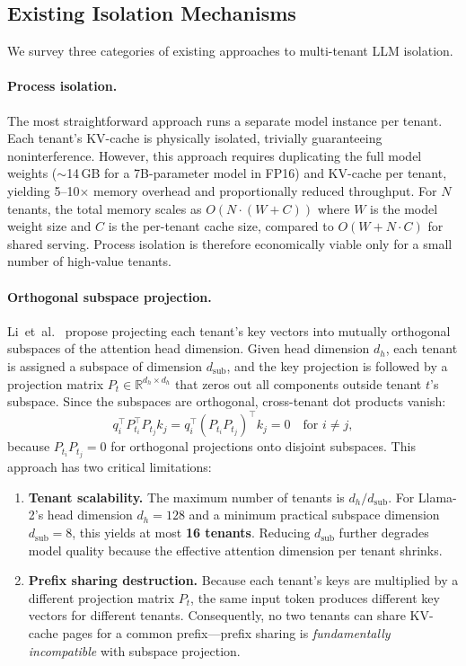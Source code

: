 \documentclass[11pt]{article}
\begin{document}
\subsection{Existing Isolation Mechanisms}
\label{sec:bg_isolation}

We survey three categories of existing approaches to multi-tenant LLM
isolation.

\paragraph{Process isolation.}
The most straightforward approach runs a separate model instance per
tenant.  Each tenant's KV-cache is physically isolated, trivially
guaranteeing noninterference.  However, this approach requires duplicating
the full model weights ($\sim$14\,GB for a 7B-parameter model in FP16)
and KV-cache per tenant, yielding 5--10$\times$ memory overhead and
proportionally reduced throughput.  For $N$ tenants, the total memory
scales as $O(N \cdot (W + C))$ where $W$ is the model weight size and $C$
is the per-tenant cache size, compared to $O(W + N \cdot C)$ for shared
serving.  Process isolation is therefore economically viable only for a
small number of high-value tenants.

\paragraph{Orthogonal subspace projection.}
Li~et~al.~\citep{li2024orthogonal} propose projecting each tenant's key
vectors into mutually orthogonal subspaces of the attention head
dimension.  Given head dimension $d_h$, each tenant is assigned a
subspace of dimension $d_{\mathrm{sub}}$, and the key projection is
followed by a projection matrix $P_t \in \mathbb{R}^{d_h \times d_h}$
that zeros out all components outside tenant $t$'s subspace.  Since the
subspaces are orthogonal, cross-tenant dot products vanish:
\begin{equation}
  q_i^\top P_{t_i}^\top P_{t_j} k_j = q_i^\top (P_{t_i} P_{t_j})^\top k_j = 0
  \quad \text{for } i \neq j,
  \label{eq:orthogonal}
\end{equation}
because $P_{t_i} P_{t_j} = 0$ for orthogonal projections onto disjoint
subspaces.  This approach has two critical limitations:
\begin{enumerate}[leftmargin=*,itemsep=2pt]
  \item \textbf{Tenant scalability.} The maximum number of tenants is
    $d_h / d_{\mathrm{sub}}$.  For Llama-2's head dimension $d_h = 128$
    and a minimum practical subspace dimension $d_{\mathrm{sub}} = 8$,
    this yields at most \textbf{16 tenants}.  Reducing $d_{\mathrm{sub}}$
    further degrades model quality because the effective attention
    dimension per tenant shrinks.
  \item \textbf{Prefix sharing destruction.} Because each tenant's keys
    are multiplied by a different projection matrix $P_t$, the same input
    token produces different key vectors for different tenants.
    Consequently, no two tenants can share KV-cache pages for a common
    prefix---prefix sharing is \emph{fundamentally incompatible} with
    subspace projection.
\end{enumerate}
\end{document}
